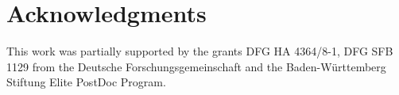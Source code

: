 \section{Acknowledgments}
This work was partially supported by the grants DFG HA 4364/8-1, DFG SFB 1129 from the Deutsche Forschungsgemeinschaft and the Baden-Württemberg Stiftung Elite PostDoc Program.
